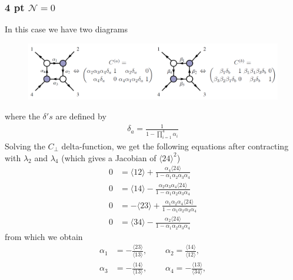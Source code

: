 \documentclass[letter,11pt]{article}
\newcommand{\ab}[1]{\langle #1 \rangle}
\begin{document}
\subsubsection{ 4 pt $\mathcal{N}=0$}
In this case we have two diagrams
\begin{figure}[H]
	\centering
	\includegraphics[width=1.1\linewidth]{YM4pt}
	\caption{}
	\label{fig:jexample}
\end{figure}
where the $\delta's$ are defined by
\begin{equation}
	\begin{aligned}
		\delta_a=\frac{1}{1-\prod_{i=1}^{4}\alpha_i}
	\end{aligned}
\end{equation}
Solving the $C_\perp$ delta-function, we get the following equations after contracting with $\lambda_2$ and $\lambda_4$ (which gives a Jacobian of $\ab{24}^2$)
\begin{equation}
	\begin{aligned} \label{eq:1}
		           0&=   
		\langle 1 2 \rangle + \frac{ \alpha_{4} \langle 2 4\rangle
		}{1 - \alpha_{1} \alpha_{2} \alpha_{3} \alpha_{4}}
		\\
 0&=   
\langle 1 4\rangle - \frac{\alpha_{2} \alpha_{3} \alpha_{4} \langle 2 4\rangle
}{1 - \alpha_{1} \alpha_{2} \alpha_{3} \alpha_{4}}
\\
 0&=   
-\langle 23\rangle + \frac{\alpha_{1} \alpha_{2} \alpha_{4} \langle 2 4\rangle
}{1 - \alpha_{1} \alpha_{2} \alpha_{3} \alpha_{4}}
\\
	 0&=   
	\langle 3 4\rangle - \frac{\alpha_{2}  \langle 2 4\rangle
	}{1 - \alpha_{1} \alpha_{2} \alpha_{3} \alpha_{4}}
	\end{aligned}
\end{equation}
from which we obtain
\begin{equation}
	\begin{aligned} \label{eq:1}
	\alpha_1&=-\frac{\langle 23 \rangle}{\langle 13\rangle},~~~~~~~~~~\alpha_2=\frac{\langle 14 \rangle}{\langle 12\rangle},\\
	\alpha_3&=-\frac{\langle 14 \rangle}{\langle 13\rangle},~~~~~~~~~~	\alpha_4=-\frac{\langle 13 \rangle}{\langle 34\rangle},
	\end{aligned}
\end{equation}
\end{document}
